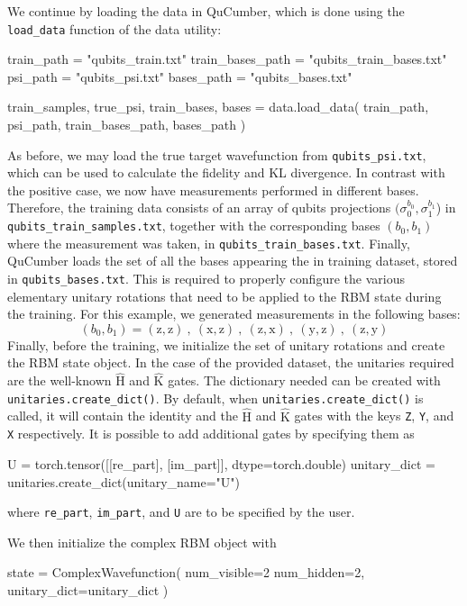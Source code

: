 \documentclass[submission, Phys, hidelnks]{SciPost}
\begin{document}
We continue by loading the data in QuCumber, which is done using the \verb|load_data| function of the data utility:
\begin{python}
train_path = "qubits_train.txt"
train_bases_path = "qubits_train_bases.txt"
psi_path = "qubits_psi.txt"
bases_path = "qubits_bases.txt"

train_samples, true_psi, train_bases, bases = data.load_data(
  train_path, psi_path, train_bases_path, bases_path
)
\end{python}
As before, we may load the true target wavefunction from \verb|qubits_psi.txt|, which can be used to calculate the fidelity and KL divergence. In contrast with the positive case, we now have measurements performed in different bases. Therefore, the training data consists of an array of qubits projections $(\sigma_0^{b_0},\sigma_1^{b_1}$) in \verb|qubits_train_samples.txt|, together with the corresponding bases $(b_0,b_1)$ where the measurement was taken, in \verb|qubits_train_bases.txt|. Finally, QuCumber loads the set of all the bases appearing the in training dataset, stored in \verb|qubits_bases.txt|. This is required to properly configure the various elementary unitary rotations that need to be applied to the RBM state during the training. For this example, we generated measurements in the following bases:
\begin{equation}
    (b_0, b_1)=(\mathrm{z},\mathrm{z})\:,\:(\mathrm{x},\mathrm{z})\:,\:(\mathrm{z},\mathrm{x})\:,\:(\mathrm{y},\mathrm{z})\:,\:(\mathrm{z},\mathrm{y})
\end{equation}
Finally, before the training, we initialize the set of unitary rotations and create the RBM state object. In the case of the provided dataset, the unitaries required are the well-known $\hat{\mathrm{H}}$ and $\hat{\mathrm{K}}$ gates. The dictionary needed can be created with \verb|unitaries.create_dict()|. 
By default, when \verb|unitaries.create_dict()| is called, it will contain the identity and the $\hat{\mathrm{H}}$ and $\hat{\mathrm{K}}$ gates with the keys \verb|Z|, \verb|Y|, and \verb|X| respectively. It is possible to add additional gates by specifying them as 
\begin{python}
U = torch.tensor([[re_part], [im_part]], dtype=torch.double)
unitary_dict = unitaries.create_dict(unitary_name="U")
\end{python}
where \verb|re_part|, \verb|im_part|, and \verb|U| are to be specified by the user.

We then initialize the complex RBM object with
\begin{python}
state = ComplexWavefunction(
   num_visible=2 num_hidden=2, unitary_dict=unitary_dict
)
\end{python}
\end{document}
